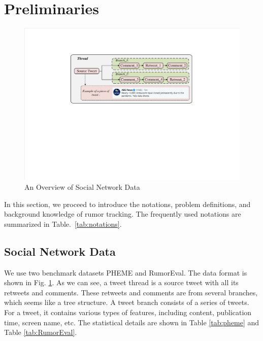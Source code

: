 \section{Preliminaries}
\label{sec:perliminary}

\begin{figure}[tbp]
	\hspace{0ex}
	\vspace{0ex}
	\centering
	\includegraphics[width = \textwidth]{fig/data_format}
	\caption{An Overview of Social Network Data}
	\label{fig:data_format}
\end{figure}

In this section, we proceed to introduce the notations, problem definitions, and background knowledge of rumor tracking. The frequently used notations are summarized in Table.~\ref{tab:notations}.

\subsection{Social Network Data}
\label{sec:social_network_data}
We use two benchmark datasets PHEME\cite{DBLP:conf/coling/KochkinaLZ18} and RumorEval\cite{DBLP:conf/semeval/EnayetE17}. The data format is shown in Fig. \ref{fig:data_format}. As we can see, a tweet thread is a source tweet with all its retweets and comments. These retweets and comments are from several branches, which seems like a tree structure. A tweet branch consists of a series of tweets. For a tweet, it contains various types of features, including content, publication time, screen name, etc. The statistical details are shown in Table \ref{tab:pheme} and Table \ref{tab:RumorEval}.



